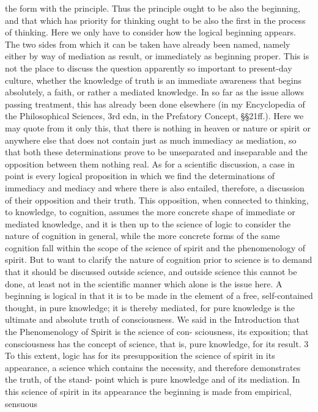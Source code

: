 the form with the principle.
Thus the principle ought to be also the beginning, and
that which has priority for thinking ought to be also
the first in the process of thinking.
Here we only have to consider how the logical beginning appears.
The two sides from which it can be taken have already been named, namely
either by way of mediation as result, or immediately as beginning proper.
This is not the place to discuss the question apparently so important
to present-day culture, whether the knowledge of truth is an immediate
awareness that begins absolutely, a faith, or rather a mediated knowledge.
In so far as the issue allows passing treatment, this has already been done
elsewhere (in my Encyclopedia of the Philosophical Sciences, 3rd edn, in the
Prefatory Concept, §§21ff.). Here we may quote from it only this, that
there is nothing in heaven or nature or spirit or anywhere else that does
not contain just as much immediacy as mediation, so that both these
determinations prove to be unseparated and inseparable and the opposition
between them nothing real. As for a scientific discussion, a case in point is
every logical proposition in which we find the determinations of immediacy
and mediacy and where there is also entailed, therefore, a discussion of their
opposition and their truth. This opposition, when connected to thinking,
to knowledge, to cognition, assumes the more concrete shape of immediate
or mediated knowledge, and it is then up to the science of logic to consider
the nature of cognition in general, while the more concrete forms of
the same cognition fall within the scope of the science of spirit and the
phenomenology of spirit. But to want to clarify the nature of cognition
prior to science is to demand that it should be discussed outside science,
and outside science this cannot be done, at least not in the scientific manner
which alone is the issue here.
A beginning is logical in that it is to be made in the element of a free,
self-contained thought, in pure knowledge; it is thereby mediated, for pure
knowledge is the ultimate and absolute truth of consciousness. We said in
the Introduction that the Phenomenology of Spirit is the science of con-
sciousness, its exposition; that consciousness has the concept of science,
that is, pure knowledge, for its result. 3 To this extent, logic has for its
presupposition the science of spirit in its appearance, a science which
contains the necessity, and therefore demonstrates the truth, of the stand-
point which is pure knowledge and of its mediation. In this science of
spirit in its appearance the beginning is made from empirical, sensuous
